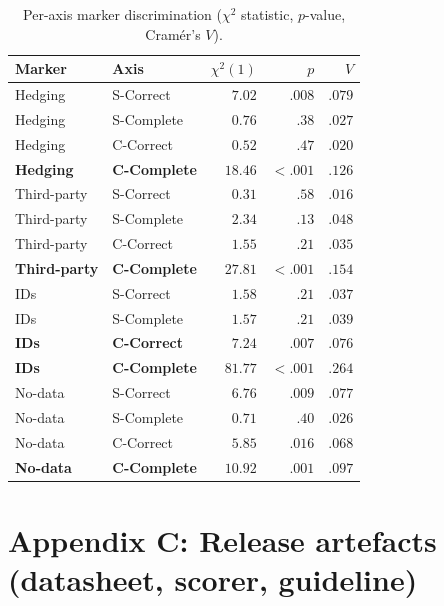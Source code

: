 \documentclass[11pt,a4paper]{article}
\begin{document}
\begin{table}[h]
\centering\small
\caption{Per-axis marker discrimination ($\chi^{2}$ statistic,
$p$-value, Cram\'{e}r's $V$).}
\label{tab:allchi2}
\begin{tabular}{llrrr}
\toprule
Marker        & Axis        & $\chi^{2}(1)$ & $p$      & $V$ \\
\midrule
Hedging       & S-Correct   & $7.02$        & $.008$   & $.079$ \\
Hedging       & S-Complete  & $0.76$        & $.38$    & $.027$ \\
Hedging       & C-Correct   & $0.52$        & $.47$    & $.020$ \\
\textbf{Hedging} & \textbf{C-Complete} & \textbf{$18.46$} & \textbf{$<.001$} & \textbf{$.126$} \\
Third-party   & S-Correct   & $0.31$        & $.58$    & $.016$ \\
Third-party   & S-Complete  & $2.34$        & $.13$    & $.048$ \\
Third-party   & C-Correct   & $1.55$        & $.21$    & $.035$ \\
\textbf{Third-party} & \textbf{C-Complete} & \textbf{$27.81$} & \textbf{$<.001$} & \textbf{$.154$} \\
IDs           & S-Correct   & $1.58$        & $.21$    & $.037$ \\
IDs           & S-Complete  & $1.57$        & $.21$    & $.039$ \\
\textbf{IDs}  & \textbf{C-Correct} & \textbf{$7.24$} & \textbf{$.007$} & \textbf{$.076$} \\
\textbf{IDs}  & \textbf{C-Complete} & \textbf{$81.77$} & \textbf{$<.001$} & \textbf{$.264$} \\
No-data       & S-Correct   & $6.76$        & $.009$   & $.077$ \\
No-data       & S-Complete  & $0.71$        & $.40$    & $.026$ \\
No-data       & C-Correct   & $5.85$        & $.016$   & $.068$ \\
\textbf{No-data} & \textbf{C-Complete} & \textbf{$10.92$} & \textbf{$.001$} & \textbf{$.097$} \\
\bottomrule
\end{tabular}
\end{table}

\section*{Appendix C: Release artefacts (datasheet, scorer, guideline)}
\label{app:datasheet}
\end{document}

